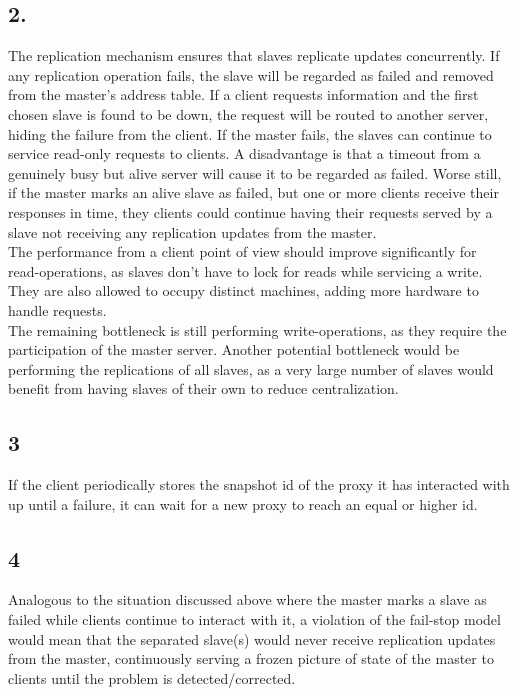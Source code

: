 \documentclass[12pt]{article}
\begin{document}
\subsection*{2.}
The replication mechanism ensures that slaves replicate updates concurrently. If any replication operation fails, the slave will be regarded as failed and removed from the master's address table. If a client requests information and the first chosen slave is found to be down, the request will be routed to another server, hiding the failure from the client. If the master fails, the slaves can continue to service read-only requests to clients. A disadvantage is that a timeout from a genuinely busy but alive server will cause it to be regarded as failed. Worse still, if the master marks an alive slave as failed, but one or more clients receive their responses in time, they clients could continue having their requests served by a slave not receiving any replication updates from the master. \\
The performance from a client point of view should improve significantly for read-operations, as slaves don't have to lock for reads while servicing a write. They are also allowed to occupy distinct machines, adding more hardware to handle requests. \\
The remaining bottleneck is still performing write-operations, as they require the participation of the master server. Another potential bottleneck would be performing the replications of all slaves, as a very large number of slaves would benefit from having slaves of their own to reduce centralization.

\subsection*{3}
If the client periodically stores the snapshot id of the proxy it has interacted with up until a failure, it can wait for a new proxy to reach an equal or higher id.

\subsection*{4}
Analogous to the situation discussed above where the master marks a slave as failed while clients continue to interact with it, a violation of the fail-stop model would mean that the separated slave(s) would never receive replication updates from the master, continuously serving a frozen picture of state of the master to clients until the problem is detected/corrected.
\end{document}
